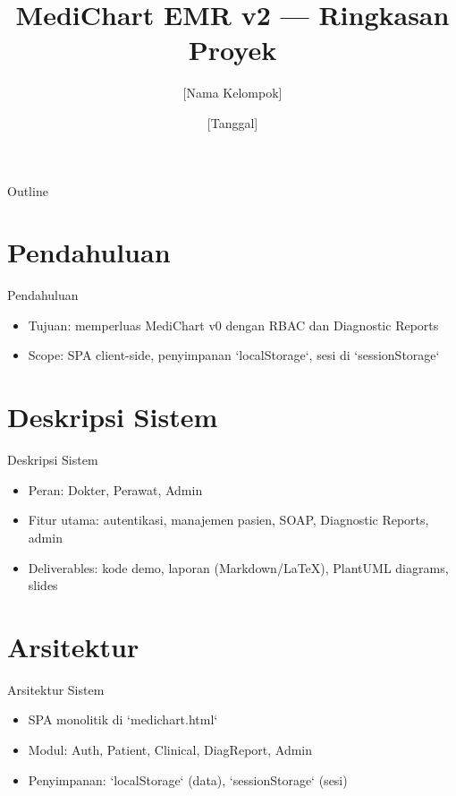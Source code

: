 \documentclass{beamer}
\title{MediChart EMR v2 — Ringkasan Proyek}
\author{[Nama Kelompok]}
\institute{Konsep Teknologi Informasi}
\date{[Tanggal]}
\begin{document}
\begin{frame}
  \titlepage
\end{frame}

\begin{frame}{Outline}
  \tableofcontents[hideallsubsections]
\end{frame}

\section{Pendahuluan}
\begin{frame}{Pendahuluan}
  \begin{itemize}
    \item Tujuan: memperluas MediChart v0 dengan RBAC dan Diagnostic Reports
    \item Scope: SPA client-side, penyimpanan `localStorage`, sesi di `sessionStorage`
  \end{itemize}
\end{frame}

\section{Deskripsi Sistem}
\begin{frame}{Deskripsi Sistem}
  \begin{itemize}
    \item Peran: Dokter, Perawat, Admin
    \item Fitur utama: autentikasi, manajemen pasien, SOAP, Diagnostic Reports, admin
    \item Deliverables: kode demo, laporan (Markdown/LaTeX), PlantUML diagrams, slides
  \end{itemize}
\end{frame}

\section{Arsitektur}
\begin{frame}{Arsitektur Sistem}
  \begin{itemize}
    \item SPA monolitik di `medichart.html`
    \item Modul: Auth, Patient, Clinical, DiagReport, Admin
    \item Penyimpanan: `localStorage` (data), `sessionStorage` (sesi)
  \end{itemize}
\end{frame}
\end{document}
